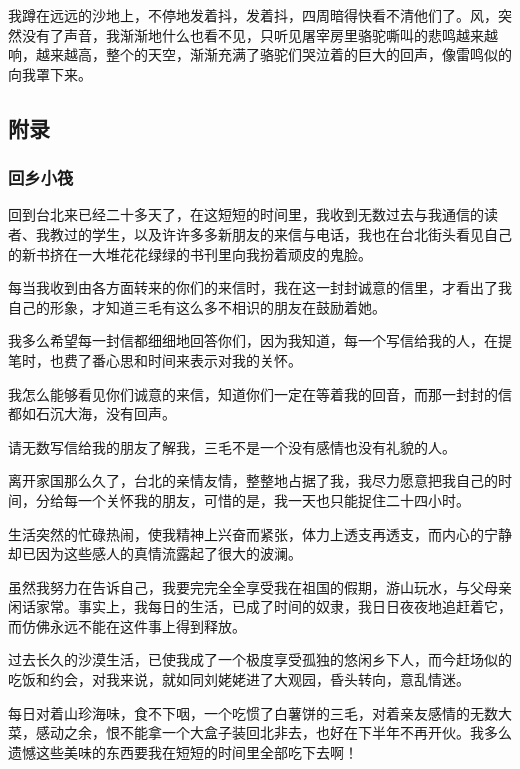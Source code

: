 \par 我蹲在远远的沙地上，不停地发着抖，发着抖，四周暗得快看不清他们了。风，突然没有了声音，我渐渐地什么也看不见，只听见屠宰房里骆驼嘶叫的悲鸣越来越响，越来越高，整个的天空，渐渐充满了骆驼们哭泣着的巨大的回声，像雷鸣似的向我罩下来。


\subsection{附录}

\subsubsection{回乡小筏}

\par {}
\par 回到台北来已经二十多天了，在这短短的时间里，我收到无数过去与我通信的读者、我教过的学生，以及许许多多新朋友的来信与电话，我也在台北街头看见自己的新书挤在一大堆花花绿绿的书刊里向我扮着顽皮的鬼脸。
\par 每当我收到由各方面转来的你们的来信时，我在这一封封诚意的信里，才看出了我自己的形象，才知道三毛有这么多不相识的朋友在鼓励着她。
\par 我多么希望每一封信都细细地回答你们，因为我知道，每一个写信给我的人，在提笔时，也费了番心思和时间来表示对我的关怀。
\par 我怎么能够看见你们诚意的来信，知道你们一定在等着我的回音，而那一封封的信都如石沉大海，没有回声。
\par 请无数写信给我的朋友了解我，三毛不是一个没有感情也没有礼貌的人。
\par 离开家国那么久了，台北的亲情友情，整整地占据了我，我尽力愿意把我自己的时间，分给每一个关怀我的朋友，可惜的是，我一天也只能捉住二十四小时。
\par 生活突然的忙碌热闹，使我精神上兴奋而紧张，体力上透支再透支，而内心的宁静却已因为这些感人的真情流露起了很大的波澜。
\par 虽然我努力在告诉自己，我要完完全全享受我在祖国的假期，游山玩水，与父母亲闲话家常。事实上，我每日的生活，已成了时间的奴隶，我日日夜夜地追赶着它，而仿佛永远不能在这件事上得到释放。
\par 过去长久的沙漠生活，已使我成了一个极度享受孤独的悠闲乡下人，而今赶场似的吃饭和约会，对我来说，就如同刘姥姥进了大观园，昏头转向，意乱情迷。
\par 每日对着山珍海味，食不下咽，一个吃惯了白薯饼的三毛，对着亲友感情的无数大菜，感动之余，恨不能拿一个大盒子装回北非去，也好在下半年不再开伙。我多么遗憾这些美味的东西要我在短短的时间里全部吃下去啊！
